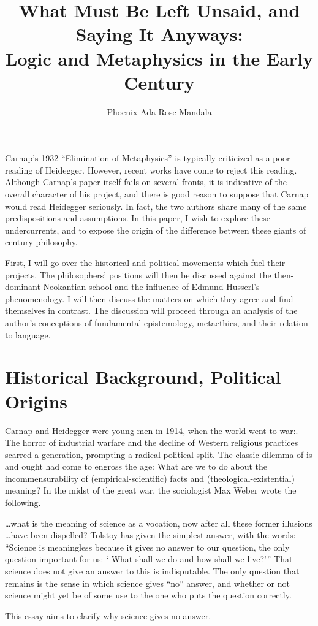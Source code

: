 \documentclass[leqno, 12pt]{turabian-researchpaper}
\title{What Must Be Left Unsaid, and Saying It Anyways: \\ Logic and Metaphysics
in the Early \nth{20} Century}
\author{Phoenix Ada Rose Mandala}
\begin{document}
	\maketitle

	Carnap's 1932 \enquote{Elimination of Metaphysics} \nocite{carnap1966} is
	typically criticized as a poor reading of Heidegger. However, recent works
	have come to reject this reading. Although Carnap's paper itself fails on several
	fronts, it is indicative of the overall character of his project, and there is
	good reason to suppose that Carnap would read Heidegger seriously. In fact, the
	two authors share many of the same predispositions and assumptions. In this
	paper, I wish to explore these undercurrents, and to expose the origin of the
	difference between these giants of  century philosophy.

	First, I will go over the historical and political movements which fuel their
	projects. The philosophers' positions will then be discussed against the then-dominant
	Neokantian school and the influence of Edmund Husserl's phenomenology. I will then
	discuss the matters on which they agree and find themselves in contrast. The
	discussion will proceed through an analysis of the author's conceptions of
	fundamental epistemology, metaethics, and their relation to language.

	\section{Historical Background, Political Origins}


	Carnap and Heidegger were young men in 1914, when the world went to war:. The horror
	of industrial warfare and the decline of Western religious practices scarred a
	generation, prompting a radical political split. The classic dilemma of is and
	ought had come to engross the age: What are we to do about the
	incommensurability of (empirical-scientific) facts and (theological-existential)
	meaning? In the midst of the great war, the sociologist Max Weber wrote the
	following.

	\begin{displayquote}
		 \dots what is the meaning of science as a vocation,
		now after all these former illusions \dots have been dispelled? Tolstoy has given
		the simplest answer, with the words: \enquote{Science is meaningless because it gives %
		no answer to our question, the only question important for us: \enquote{%
		What shall we do and how shall we live?}}
		That science does not give an answer to this is indisputable. The only question
		that remains is the sense in which science gives \enquote{no} answer, and whether
		or not science might yet be of some use to the one who puts the question correctly.
	\end{displayquote}
	This essay aims to clarify why science gives no answer.
\end{document}
